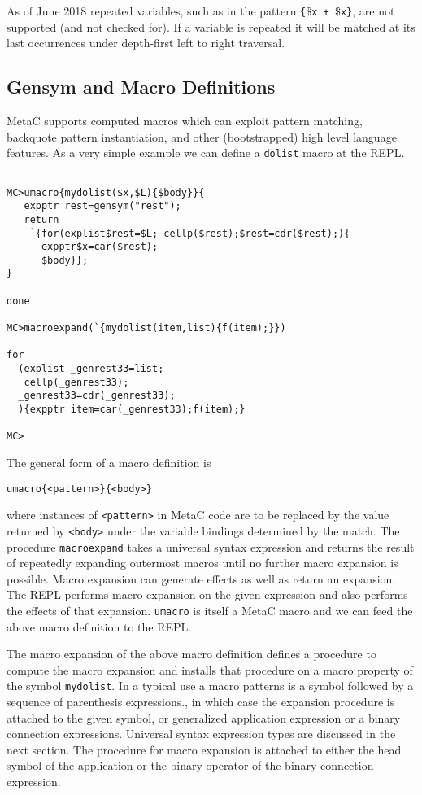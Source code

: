 \documentclass{article}
\begin{document}
As of June 2018 repeated variables, such as in the pattern {\tt \{$\$$x + $\$$x\}}, are not supported (and not checked for).
If a variable is repeated it will be matched at its last occurrences under depth-first left to right traversal.

\subsection{Gensym and Macro Definitions}

MetaC supports computed macros which can exploit pattern matching, backquote pattern instantiation, and other (bootstrapped) high level language features.
As a very simple example we can define a {\tt dolist} macro at the REPL.

\begin{verbatim}

MC>umacro{mydolist($x,$L){$body}}{
   expptr rest=gensym("rest");
   return
    `{for(explist$rest=$L; cellp($rest);$rest=cdr($rest);){
      expptr$x=car($rest);
      $body}};
}

done

MC>macroexpand(`{mydolist(item,list){f(item);}})

for
  (explist _genrest33=list;
   cellp(_genrest33);
  _genrest33=cdr(_genrest33);
  ){expptr item=car(_genrest33);f(item);}

MC>
\end{verbatim}

The general form of a macro definition is
\begin{verbatim}
umacro{<pattern>}{<body>}
\end{verbatim}
where instances of {\tt <pattern>} in MetaC code are to be replaced by the value returned by {\tt <body>} under the variable bindings determined by the match.
The procedure {\tt macroexpand} takes a universal syntax expression
and returns the result of repeatedly expanding outermost macros until no further macro expansion is possible.  Macro expansion can generate effects as well as return an expansion.  The REPL performs
macro expansion on the given expression and also performs the effects of that expansion.  {\tt umacro} is itself a MetaC macro and we can feed the above macro definition to the REPL.

The macro expansion of the above macro definition defines a procedure to compute the macro expansion and installs that procedure on a macro property of the symbol {\tt mydolist}.
In a typical use a macro patterns is a symbol followed by a sequence of parenthesis expressions., in which case the expansion procedure is attached to the given symbol,
or generalized application expression or a binary connection expressions.  Universal syntax expression types are discussed in the next section.
The procedure for macro expansion is attached to either the head symbol of the application
or the binary operator of the binary connection expression.
\end{document}
